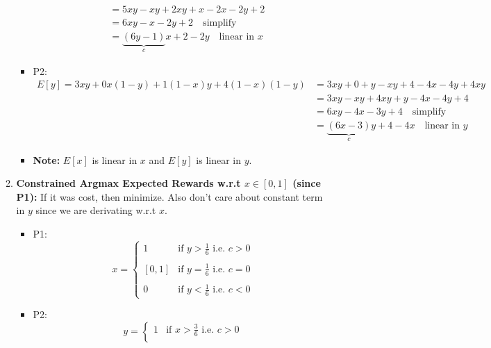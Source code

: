 \begin{example}
\begin{enumerate}
\begin{enumerate}
\begin{itemize}
\begin{align*}
                    &= 5xy - xy + 2xy + x - 2x - 2y + 2 \\
                    &= 6xy - x - 2y + 2 \quad \text{simplify} \\
                    &= \underbrace{(6y - 1)}_{c}x + 2 - 2y \quad \text{linear in $x$} 
                \end{align*}
                \item P2:
                \begin{align*}
                    E[y] = 3xy + 0x(1-y) + 1(1-x)y + 4(1-x)(1-y) &= 3xy + 0 + y - xy + 4 - 4x - 4y + 4xy \\
                    &= 3xy - xy + 4xy + y - 4x - 4y + 4 \\
                    &= 6xy - 4x - 3y + 4 \quad \text{simplify} \\
                    &= \underbrace{(6x - 3)}_{c}y + 4 - 4x \quad \text{linear in $y$}
                \end{align*}
                \item \textbf{Note:} $E[x]$ is linear in $x$ and $E[y]$ is linear in $y$.
            \end{itemize}
            \item \textbf{Constrained Argmax Expected Rewards w.r.t $x \in [0,1]$ (since P1):} If it was cost, then minimize. Also don't care about constant term in $y$ since we are derivating w.r.t $x$.
            \begin{itemize}
                \item P1: 
                \begin{equation*}
                    x = \begin{cases}
                        1 & \text{if } y > \frac{1}{6} \text{ i.e. } c > 0 \\
                        & \\
                        [0,1] & \text{if } y=\frac{1}{6} \text{ i.e. }c = 0 \\
                        & \\
                        0 & \text{if } y < \frac{1}{6} \text{ i.e. } c < 0 
                    \end{cases}
                \end{equation*}
                \item P2:
                \begin{equation*}
                    y = \begin{cases}
                        1 & \text{if } x > \frac{3}{6} \text{ i.e. } c > 0 \\

\end{cases}
\end{equation*}
\end{itemize}
\end{enumerate}
\end{enumerate}
\end{example}
